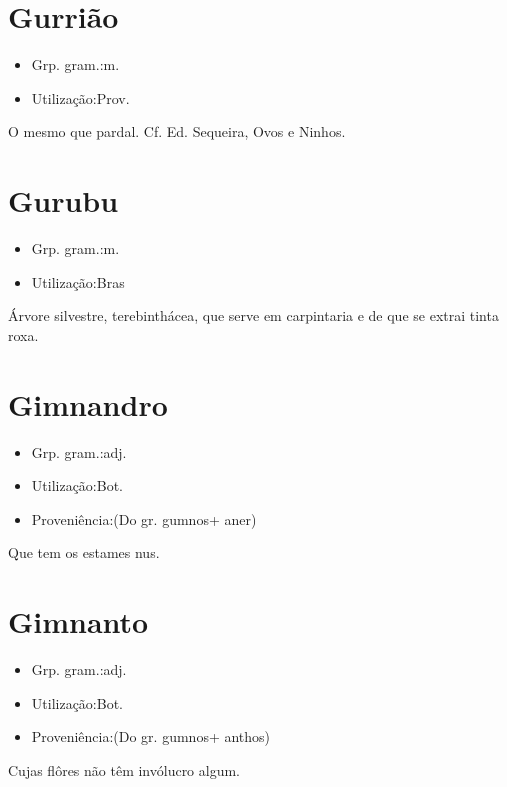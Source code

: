 \section{Gurrião}
\begin{itemize}
\item {Grp. gram.:m.}
\end{itemize}
\begin{itemize}
\item {Utilização:Prov.}
\end{itemize}
O mesmo que \textunderscore pardal\textunderscore . Cf. Ed. Sequeira, \textunderscore Ovos e Ninhos\textunderscore .
\section{Gurubu}
\begin{itemize}
\item {Grp. gram.:m.}
\end{itemize}
\begin{itemize}
\item {Utilização:Bras}
\end{itemize}
Árvore silvestre, terebinthácea, que serve em carpintaria e de que se extrai tinta roxa.
\section{Gimnandro}
\begin{itemize}
\item {Grp. gram.:adj.}
\end{itemize}
\begin{itemize}
\item {Utilização:Bot.}
\end{itemize}
\begin{itemize}
\item {Proveniência:(Do gr. \textunderscore gumnos\textunderscore  + \textunderscore aner\textunderscore )}
\end{itemize}
Que tem os estames nus.
\section{Gimnanto}
\begin{itemize}
\item {Grp. gram.:adj.}
\end{itemize}
\begin{itemize}
\item {Utilização:Bot.}
\end{itemize}
\begin{itemize}
\item {Proveniência:(Do gr. \textunderscore gumnos\textunderscore  + \textunderscore anthos\textunderscore )}
\end{itemize}
Cujas flôres não têm invólucro algum.
